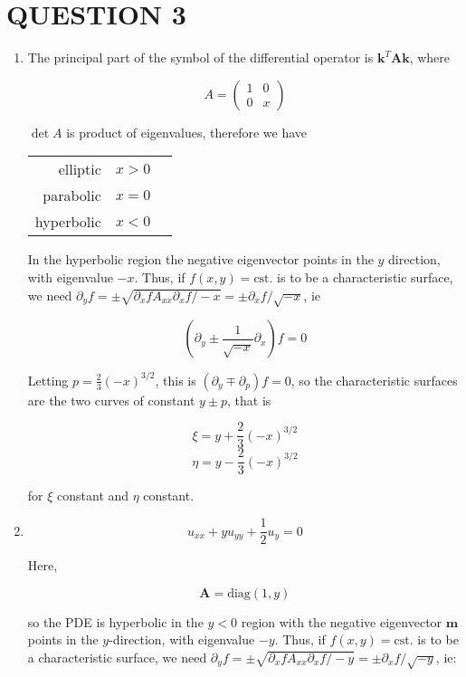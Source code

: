 \documentclass[a4paper]{article}
\begin{document}
\section{QUESTION 3}

\begin{enumerate}
	\item The principal part of the symbol of the differential operator is $ \mathbf{k}^{T} \mathbf{A} \mathbf{k} $, where 

	\[ A = \begin{pmatrix}
	1 & 0 \\
	0 & x
	\end{pmatrix} \]
	
	$ \det A  $ is product of eigenvalues, therefore we have 
	
	\begin{center}
		\begin{tabular}{rll}
			elliptic  & $ x > 0  $ \\
			parabolic  &  $ x = 0 $  \\
			hyperbolic &  $ x < 0$ 
		\end{tabular}
	\end{center}

	In the hyperbolic region the negative eigenvector points in the $ y $ direction, with eigenvalue $ -x $. Thus, if $ f(x,y) = \text{cst.} $ is to be a characteristic surface, we need $ \partial_{y} f = \pm \sqrt{ \partial_{x} f  A_{xx} \partial_{x} f / -x } = \pm  \partial_{x} f / \sqrt{-x} $, ie
	
	
	\[ (\partial_{y} \pm \frac{1}{\sqrt{-x}} \partial_{x}  ) f = 0 \]
	
	
	Letting $ p = \frac{2}{3}(-x)^{3/2} $, this is $ (\partial_{y} \mp \partial_{p})f = 0 $, so the characteristic surfaces are the two curves of constant $ y \pm p $, that is
	
	\[ \xi = y + \frac{2}{3} (-x)^{3/2} \]
	\[ \eta = y - \frac{2}{3} (-x)^{3/2} \]
	
	for $ \xi $ constant and $ \eta $ constant.

	\item \[ u_{xx} + y u_{yy} + \frac{1}{2} u_{y} = 0 \]
	
	Here,
	
	\[ \mathbf{A} = \text{diag}(1,y) \]
	
	so the PDE is hyperbolic in the $ y < 0 $ region with the negative eigenvector $ \mathbf{m} $ points in the $ y $-direction, with eigenvalue $ -y $. Thus, if $ f(x,y) = \text{cst.} $ is to be a characteristic surface, we need $ \partial_{y} f = \pm \sqrt{ \partial_{x} f  A_{xx} \partial_{x} f / -y } = \pm \partial_{x} f / \sqrt{-y}  $, ie:
	

\end{enumerate}
\end{document}
